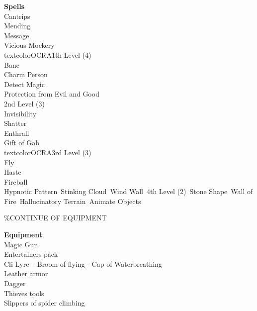 \documentclass[11pt]{article}
\begin{document}
\begin{minipage}[t]{.5\textwidth}
{\huge \textbf{\Fontauri Spells}}\\
\textcolor{OCRA}{Cantrips}\\
Mending\\
Message\\
Vicious Mockery\\
textcolor{OCRA}{1th Level (4)}\\
Bane \\
Charm Person\\
Detect Magic\\
Protection from Evil and Good\\
\textcolor{OCRA}{2nd Level (3)}\\
Invisibility\\
Shatter\\
Enthrall\\
Gift of Gab\\
textcolor{OCRA}{3rd Level (3)}\\
Fly\\
Haste\\
Fireball\\
Hypnotic Pattern\
Stinking Cloud\
Wind Wall\
\textcolor{OCRA}{4th Level (2)}\
Stone Shape\
Wall of Fire\
Hallucinatory Terrain\
Animate Objects
\end{minipage}
\%CONTINUE OF EQUIPMENT
\begin{minipage}[t]{.4\textwidth}\raggedleft
{\Large \textbf{ \Fontauri Equipment}}\\
Magic Gun \\
Entertainers pack\\
Cli Lyre\ - Broom of flying - Cap of Waterbreathing\\
Leather armor \\
Dagger\\
Thieves tools\\
Slippers of spider climbing\\
\end{minipage}
\end{document}

